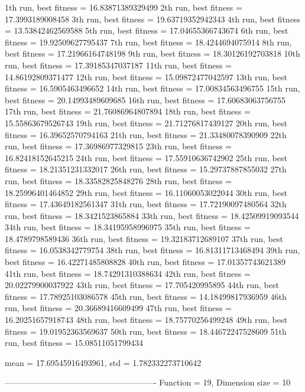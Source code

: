 1th run, best fitness = 16.83871389329499
2th run, best fitness = 17.3993189008458
3th run, best fitness = 19.63719352942343
4th run, best fitness = 13.53842462569588
5th run, best fitness = 17.04655366743674
6th run, best fitness = 19.92509627795437
7th run, best fitness = 18.4244694075914
8th run, best fitness = 17.21966164748198
9th run, best fitness = 18.30126192703818
10th run, best fitness = 17.39185347037187
11th run, best fitness = 14.86192809371477
12th run, best fitness = 15.09872477042597
13th run, best fitness = 16.5905463496652
14th run, best fitness = 17.00834563496755
15th run, best fitness = 20.14993489609685
16th run, best fitness = 17.60683063756755
17th run, best fitness = 21.76086964807894
18th run, best fitness = 15.55863679526743
19th run, best fitness = 21.71276817439127
20th run, best fitness = 16.39652570794163
21th run, best fitness = 21.33480078390909
22th run, best fitness = 17.36986977329815
23th run, best fitness = 16.82418152645215
24th run, best fitness = 17.55910636742902
25th run, best fitness = 18.21351231332017
26th run, best fitness = 15.29737887855032
27th run, best fitness = 18.33582825848276
28th run, best fitness = 18.25996401464852
29th run, best fitness = 16.11060053022044
30th run, best fitness = 17.43649182561347
31th run, best fitness = 17.72190097480564
32th run, best fitness = 18.3421523865884
33th run, best fitness = 18.42509919093544
34th run, best fitness = 18.34195958996975
35th run, best fitness = 18.4789798589436
36th run, best fitness = 19.32183712689107
37th run, best fitness = 16.0538342779754
38th run, best fitness = 16.81311713468494
39th run, best fitness = 16.42271485808828
40th run, best fitness = 17.01357743621389
41th run, best fitness = 18.74291310388634
42th run, best fitness = 20.02279900037922
43th run, best fitness = 17.705420995895
44th run, best fitness = 17.78925103086578
45th run, best fitness = 14.18499817936959
46th run, best fitness = 20.36689416609499
47th run, best fitness = 16.20251657918743
48th run, best fitness = 18.75770256499248
49th run, best fitness = 19.01952363569637
50th run, best fitness = 18.44672247528609
51th run, best fitness = 15.08511051799434

mean = 17.69545916493961, std = 1.782332273710642

-------------------------------------------------------
Function = 19, Dimension size = 10

